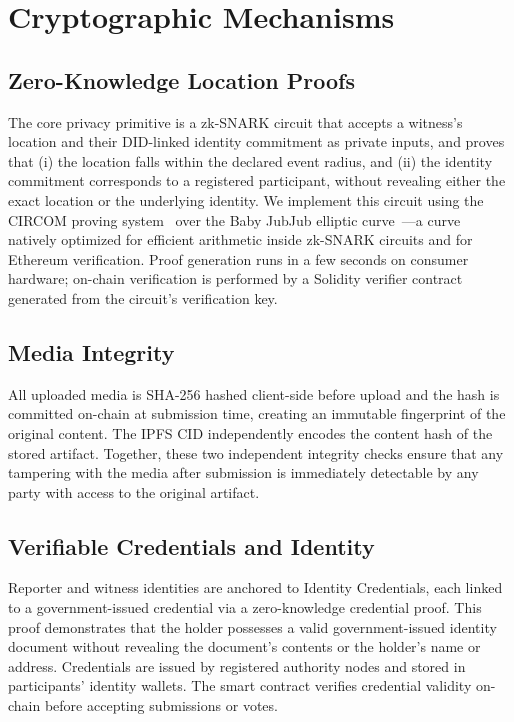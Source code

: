 \documentclass[11pt]{article}
\begin{document}
\section{Cryptographic Mechanisms}

\subsection{Zero-Knowledge Location Proofs}

The core privacy primitive is a zk-SNARK circuit that accepts a witness's
location and their DID-linked identity commitment as private
inputs, and proves that (i) the location falls within the declared event
radius, and (ii) the identity commitment corresponds to a registered
participant, without revealing either the exact location or the underlying
identity. We implement this circuit using the CIRCOM proving system~\cite{circom}
over the Baby JubJub elliptic curve~\cite{babyjubjub}—a curve natively
optimized for efficient arithmetic inside zk-SNARK circuits and for Ethereum
verification. Proof generation runs in a few seconds on consumer hardware;
on-chain verification is performed by a Solidity verifier contract generated
from the circuit's verification key.

\subsection{Media Integrity}

All uploaded media is SHA-256 hashed client-side before upload and the hash
is committed on-chain at submission time, creating an immutable fingerprint of
the original content. The IPFS CID independently encodes the content hash of
the stored artifact. Together, these two independent integrity checks ensure
that any tampering with the media after submission is immediately detectable by
any party with access to the original artifact.

\subsection{Verifiable Credentials and Identity}

Reporter and witness identities are anchored to Identity Credentials, each linked to a government-issued credential via a zero-knowledge
credential proof. This proof demonstrates that the holder possesses a valid
government-issued identity document without revealing the document's contents
or the holder's name or address. Credentials are issued by registered authority
nodes and stored in participants' identity wallets. The smart contract verifies
credential validity on-chain before accepting submissions or votes.
\end{document}
